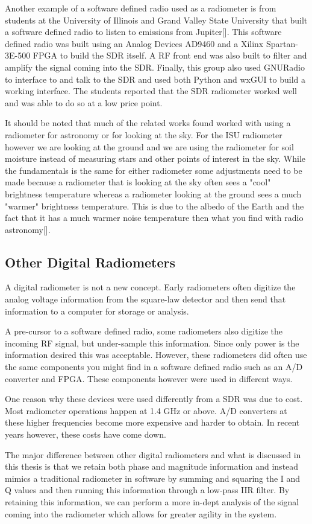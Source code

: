 Another example of a software defined radio used as a radiometer is from students at the University of Illinois and Grand Valley State University that built a software defined radio to listen to emissions from Jupiter[\cite{Behnke}].  This software defined radio was built using an Analog Devices AD9460 and a Xilinx Spartan-3E-500 FPGA to build the SDR itself.  A RF front end was also built to filter and amplify the signal coming into the SDR.  Finally, this group also used GNURadio to interface to and talk to the SDR and used both Python and wxGUI to build a working interface.  The students reported that the SDR radiometer worked well and was able to do so at a low price point.

It should be noted that much of the related works found worked with using a radiometer for astronomy or for looking at the sky.  For the ISU radiometer however we are looking at the ground and we are using the radiometer for soil moisture instead of measuring stars and other points of interest in the sky.  While the fundamentals is the same for either radiometer some adjustments need to be made because a radiometer that is looking at the sky often sees a "cool" brightness temperature whereas a radiometer looking at the ground sees a much "warmer" brightness temperature.  This is due to the albedo of the Earth and the fact that it has a much warmer noise temperature then what you find with radio astronomy[\cite{Tiuri}].
\subsection{Other Digital Radiometers}

A digital radiometer is not a new concept.  Early radiometers often digitize the analog voltage information from the square-law detector and then send that information to a computer for storage or analysis.  

A pre-cursor to a software defined radio, some radiometers also digitize the incoming RF signal, but under-sample this information.  Since only power is the information desired this was acceptable.  However, these radiometers did often use the same components you might find in a software defined radio such as an A/D converter and FPGA.  These components however were used in different ways.

One reason why these devices were used differently from a SDR was due to cost.  Most radiometer operations happen at 1.4 GHz or above.  A/D converters at these higher frequencies become more expensive and harder to obtain.  In recent years however, these costs have come down.

The major difference between other digital radiometers and what is discussed in this thesis is that we retain both phase and magnitude information and instead mimics a traditional radiometer in software by summing and squaring the I and Q values and then running this information through a low-pass IIR filter.  By retaining this information, we can perform a more in-dept analysis of the signal coming into the radiometer which allows for greater agility in the system.